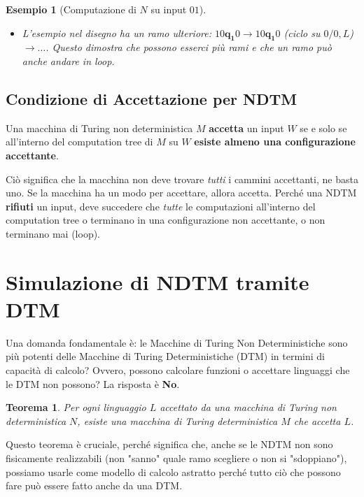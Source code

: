 \documentclass[a4paper]{article}
\newtheorem{theorem}{Teorema}
\newtheorem{example}{Esempio}
\begin{document}
\begin{example}[Computazione di $N$ su input $01$]
\begin{enumerate}
\begin{itemize}
\begin{itemize}
\begin{itemize}
                Da $100\mathbf{q_1}\sqcup$: $q_1,\sqcup \to (q_2,\sqcup,R)$. Scriviamo $\sqcup$, spostiamo a destra.\\
                Configurazione successiva: $100\sqcup\mathbf{q_2}\sqcup$. (Questa è accettante, $q_2 \in F$).
            \end{itemize}
            \item L'esempio nel disegno ha un ramo ulteriore: $10\mathbf{q_1}0 \to 10\mathbf{q_1}0$ (ciclo su $0/0,L$) $\to \dots$. Questo dimostra che possono esserci più rami e che un ramo può anche andare in loop.
        \end{itemize}
    \end{itemize}

\end{enumerate}
\end{example}

\subsection{Condizione di Accettazione per NDTM}

Una macchina di Turing non deterministica $M$ \textbf{accetta} un input $W$ se e solo se all'interno del computation tree di $M$ su $W$ \textbf{esiste almeno una configurazione accettante}.

Ciò significa che la macchina non deve trovare \emph{tutti} i cammini accettanti, ne basta uno. Se la macchina ha un modo per accettare, allora accetta.
Perché una NDTM \textbf{rifiuti} un input, deve succedere che \emph{tutte} le computazioni all'interno del computation tree o terminano in una configurazione non accettante, o non terminano mai (loop).

\section{Simulazione di NDTM tramite DTM}

Una domanda fondamentale è: le Macchine di Turing Non Deterministiche sono più potenti delle Macchine di Turing Deterministiche (DTM) in termini di capacità di calcolo? Ovvero, possono calcolare funzioni o accettare linguaggi che le DTM non possono? La risposta è \textbf{No}.

\begin{theorem}
Per ogni linguaggio $L$ accettato da una macchina di Turing non deterministica $N$, esiste una macchina di Turing deterministica $M$ che accetta $L$.
\end{theorem}
Questo teorema è cruciale, perché significa che, anche se le NDTM non sono fisicamente realizzabili (non "sanno" quale ramo scegliere o non si "sdoppiano"), possiamo usarle come modello di calcolo astratto perché tutto ciò che possono fare può essere fatto anche da una DTM.
\end{document}
